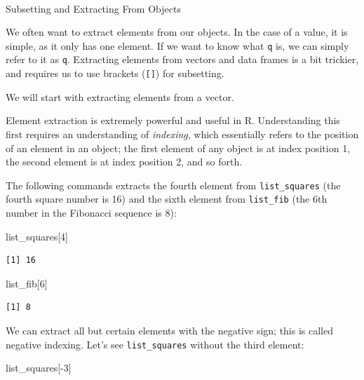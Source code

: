 \documentclass[
  letterpaper,
]{book}
\makeatletter
\let\oldparagraph\paragraph
\renewcommand{\paragraph}{
    \@ifstar
      \xxxParagraphStar
      \xxxParagraphNoStar
  }
\newcommand{\xxxParagraphStar}[1]{\oldparagraph*{#1}\mbox{}}
\newcommand{\xxxParagraphNoStar}[1]{\oldparagraph{#1}\mbox{}}
\newenvironment{Shaded}{\begin{snugshade}}{\end{snugshade}}
\newcommand{\DecValTok}[1]{\textcolor[rgb]{0.68,0.00,0.00}{#1}}
\newcommand{\NormalTok}[1]{\textcolor[rgb]{0.00,0.23,0.31}{#1}}
\newcommand{\SpecialCharTok}[1]{\textcolor[rgb]{0.37,0.37,0.37}{#1}}
\makeatother
\begin{document}
\paragraph{Subsetting and Extracting From
Objects}\label{subsetting-and-extracting-from-objects}

We often want to extract elements from our objects. In the case of a
value, it is simple, as it only has one element. If we want to know what
\texttt{q} is, we can simply refer to it as \texttt{q}. Extracting
elements from vectors and data frames is a bit trickier, and requires us
to use brackets (\texttt{{[}{]}}) for subsetting.

We will start with extracting elements from a vector.

Element extraction is extremely powerful and useful in R. Understanding
this first requires an understanding of \emph{indexing}, which
essentially refers to the position of an element in an object; the first
element of any object is at index position 1, the second element is at
index position 2, and so forth.

The following commands extracts the fourth element from
\texttt{list\_squares} (the fourth square number is 16) and the sixth
element from \texttt{list\_fib} (the 6th number in the Fibonacci
sequence is 8):

\begin{Shaded}
\begin{Highlighting}[]
\NormalTok{list\_squares[}\DecValTok{4}\NormalTok{] }
\end{Highlighting}
\end{Shaded}

\begin{verbatim}
[1] 16
\end{verbatim}

\begin{Shaded}
\begin{Highlighting}[]
\NormalTok{list\_fib[}\DecValTok{6}\NormalTok{]}
\end{Highlighting}
\end{Shaded}

\begin{verbatim}
[1] 8
\end{verbatim}

We can extract all but certain elements with the negative sign; this is
called negative indexing. Let's see \texttt{list\_squares} without the
third element:

\begin{Shaded}
\begin{Highlighting}[]
\NormalTok{list\_squares[}\SpecialCharTok{{-}}\DecValTok{3}\NormalTok{]}
\end{Highlighting}
\end{Shaded}
\end{document}
